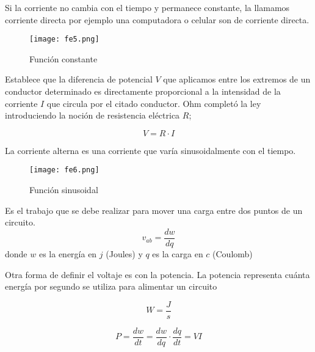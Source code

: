 Si la corriente no cambia con el tiempo y permanece constante, la llamamos corriente directa
por ejemplo una computadora o celular son de corriente directa.

\begin{figure}[h!]
	\centerline{\texttt{[image: fe5.png]}}
	\caption{Función constante}
	\label{fe5}
\end{figure}

\begin{definition}
	Establece que la diferencia de potencial $V$ que aplicamos entre los extremos de un conductor determinado es directamente proporcional a la intensidad de la corriente $I$ que circula por el citado conductor. Ohm completó la ley introduciendo la noción de resistencia eléctrica $R$;
\end{definition}

\begin{equation}
	V=R \cdot I
	\label{ohm}
\end{equation}

La corriente alterna es una corriente que varía sinusoidalmente con el tiempo.

\begin{figure}[h!]
	\centerline{\texttt{[image: fe6.png]}}
	\caption{Función sinusoidal}
	\label{fe6}
\end{figure}


\begin{definition}[Voltaje]
	Es el trabajo que se debe realizar para mover una carga entre dos puntos de un circuito.
	\begin{equation}
		v_{ab}= \frac{dw}{dq}
	\end{equation}
	donde $w$ es la energía en $j$ (Joules) y $q$ es la carga en $c$ (Coulomb)
\end{definition}

\begin{definition}[Potencia]
	Otra forma de definir el voltaje es con la potencia. La potencia representa cuánta energía por segundo se utiliza para
	alimentar un circuito
\end{definition}

\begin{equation}
	W= \frac{J}{s}
\end{equation}

\begin{equation*}
	P= \frac{dw}{dt} =\frac{dw}{dq} \cdot \frac{dq}{dt} = VI
\end{equation*}

